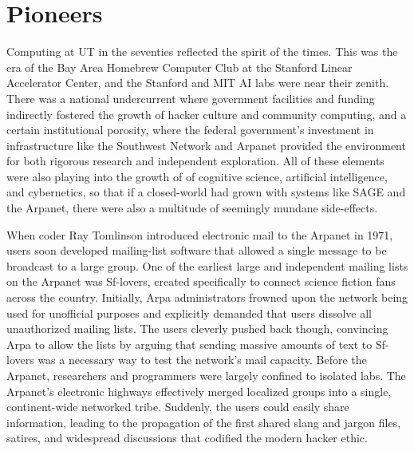 \chapter{Pioneers}

Computing at UT in the seventies reflected the spirit of the times. This was the era of the Bay Area Homebrew Computer Club at the Stanford Linear Accelerator Center, and the Stanford and MIT AI labs were near their zenith. There was a national undercurrent where government facilities and funding indirectly fostered the growth of hacker culture and community computing, and a certain institutional porosity, where the federal government’s investment in infrastructure like the Southwest Network and Arpanet provided the environment for both rigorous research and independent exploration. All of these elements were also playing into the growth of of cognitive science, artificial intelligence, and cybernetics, so that if a closed-world had grown with systems like SAGE and the Arpanet, there were also a multitude of seemingly mundane side-effects. \cite{edwardsClosedWorldComputers1996} 

When coder Ray Tomlinson introduced electronic mail to the Arpanet in 1971, users soon developed mailing-list software that allowed a single message to be broadcast to a large group. One of the earliest large and independent mailing lists on the Arpanet was Sf-lovers, created specifically to connect science fiction fans across the country. Initially, Arpa administrators frowned upon the network being used for unofficial purposes and explicitly demanded that users dissolve all unauthorized mailing lists. The users cleverly pushed back though, convincing Arpa to allow the lists by arguing that sending massive amounts of text to Sf-lovers was a necessary way to test the network's mail capacity. Before the Arpanet, researchers and programmers were largely confined to isolated labs. The Arpanet's electronic highways effectively merged localized groups into a single, continent-wide networked tribe. Suddenly, the users could easily share information, leading to the propagation of the first shared slang and jargon files, satires, and widespread discussions that codified the modern hacker ethic. \cite{sterlingShortHistoryInternet1992} \cite{hafnerWhereWizardsStay2006}

